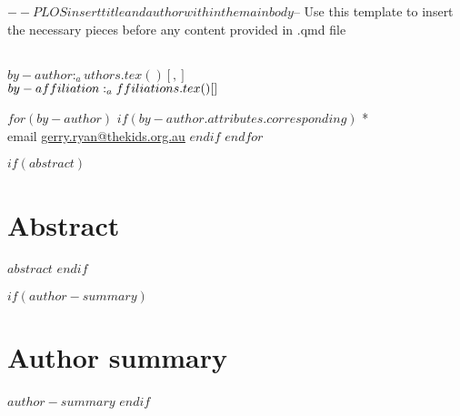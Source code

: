 $-- PLOS insert title and author within the main body
$-- Use this template to insert the necessary pieces before any content provided in .qmd file
\vspace*{0.2in}

\begin{flushleft}
{\Large
\textbf{} %
}
\newline
\\
$by-author:_authors.tex()[, ]$
\\
\bigskip
$by-affiliation:_affiliations.tex()[\\ ]$
\bigskip

%
%





$for(by-author)$
$if(by-author.attributes.corresponding)$
* \\ email \href{mailto:gerry.ryan@thekids.org.au}{gerry.ryan@thekids.org.au}
$endif$
$endfor$

\end{flushleft}

$if(abstract)$
\section*{Abstract}
$abstract$
$endif$

$if(author-summary)$
\section*{Author summary}
$author-summary$
$endif$

